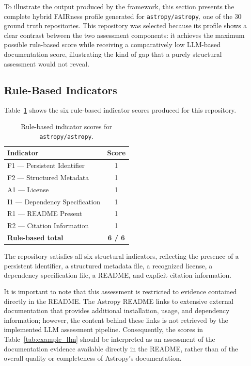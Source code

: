 To illustrate the output produced by the framework, this section
presents the complete hybrid FAIRness profile generated for
\texttt{astropy/astropy}, one of the 30 ground truth repositories.
This repository was selected because its profile shows a clear
contrast between the two assessment components: it achieves the
maximum possible rule-based score while receiving a comparatively
low LLM-based documentation score, illustrating the kind of gap
that a purely structural assessment would not reveal.

\subsection{Rule-Based Indicators}

Table~\ref{tab:example_rule} shows the six rule-based indicator
scores produced for this repository.

\begin{table}[h]
\centering
\caption{Rule-based indicator scores for \texttt{astropy/astropy}.}
\label{tab:example_rule}
\begin{tabular}{lc}
\hline
\textbf{Indicator} & \textbf{Score} \\
\hline
F1 --- Persistent Identifier    & 1 \\
F2 --- Structured Metadata      & 1 \\
A1 --- License                  & 1 \\
I1 --- Dependency Specification & 1 \\
R1 --- README Present           & 1 \\
R2 --- Citation Information     & 1 \\
\hline
\textbf{Rule-based total}       & \textbf{6 / 6} \\
\hline
\end{tabular}
\end{table}

The repository satisfies all six structural indicators, reflecting
the presence of a persistent identifier, a structured metadata file,
a recognized license, a dependency specification file, a README, and
explicit citation information.

It is important to note that this assessment is restricted to evidence
contained directly in the README. The Astropy README links to extensive
external documentation that provides additional installation, usage,
and dependency information; however, the content behind these links is
not retrieved by the implemented LLM assessment pipeline. Consequently,
the scores in Table~\ref{tab:example_llm} should be interpreted as an
assessment of the documentation evidence available directly in the
README, rather than of the overall quality or completeness of Astropy's
documentation.

